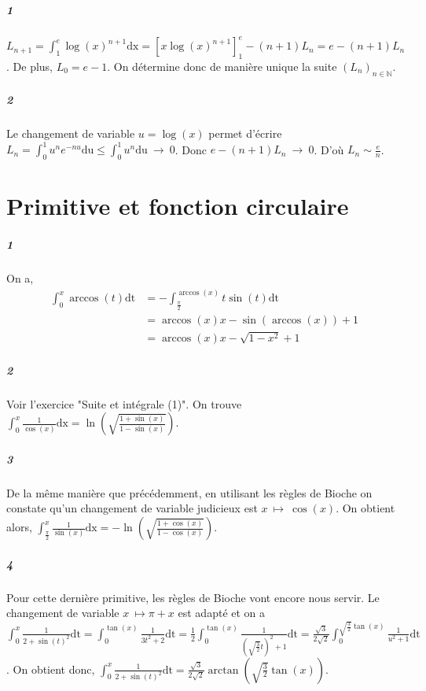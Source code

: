 \documentclass[10pt,a4paper]{article}
\begin{document}
\subparagraph{1}$L_{n+1} = \int_1^e \log(x)^{n+1} \text{dx} = [x \log(x)^{n+1}]_1^e - (n+1)L_n = e - (n+1)L_n$. De plus, $L_0 = e-1$. On détermine donc de manière unique la suite $(L_n)_{n \in \mathbb{N}}$.
\subparagraph{2}Le changement de variable $u = \log(x)$ permet d'écrire $L_n = \int_0^1 u^n e^{-nu} \text{du} \le \int_0^1 u^n \text{du} \ \longrightarrow \ 0$. Donc ${e - (n+1)L_n \ \longrightarrow \ 0}$. D'où $L_n \sim \frac{e}{n}$.


\section{Primitive et fonction circulaire}
\subparagraph{1} On a,
\begin{equation}
\begin{aligned}
\int_0^x \arccos(t) \text{dt} &= -\int_{\frac{\pi}{2}}^{\arccos(x)} t\sin(t) \text{dt} \\
&= \arccos(x)x - \sin(\arccos(x)) +1 \\
&= \arccos(x) x - \sqrt{1-x^2} + 1
\end{aligned}
\end{equation}

\subparagraph{2}Voir l'exercice "Suite et intégrale (1)". On trouve $\int_0^x \frac{1}{\cos(x)} \text{dx} = \ln \left( \sqrt{\frac{1 + \sin(x)}{1 - \sin(x)} } \right)$.
\subparagraph{3} De la même manière que précédemment, en utilisant les règles de Bioche on constate qu'un changement de variable judicieux est $x \ \mapsto \ \cos(x)$. On obtient alors, $\int_{\frac{\pi}{2}}^x \frac{1}{\sin(x)} \text{dx} = - \ln \left( \sqrt{ \frac{1 + \cos(x)}{1 - \cos(x)}} \right)$.

\subparagraph{4}Pour cette dernière primitive, les règles de Bioche vont encore nous servir. Le changement de variable $x \ \mapsto \pi + x$ est adapté et on a $\int_0^x \frac{1}{2+\sin(t)^2} \text{dt} = \int_0^{\tan(x)} \frac{1}{3t^2+2} \text{dt} = \frac{1}{2} \int_0^{\tan(x)} \frac{1}{\left( \sqrt{\frac{3}{2}}t\right)^2 +1} \text{dt} = \frac{\sqrt{3}}{2\sqrt{2}} \int_0^{\sqrt{\frac{3}{2}}\tan(x)} \frac{1}{u^2 +1} \text{dt}$. On obtient donc,
$\int_0^x \frac{1}{2+\sin(t)^2} \text{dt}= \frac{\sqrt{3}}{2\sqrt{2}}\arctan\left( \sqrt{\frac{3}{2}} \tan(x) \right) $.
\end{document}
